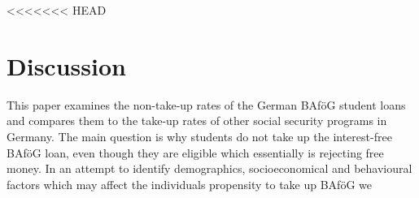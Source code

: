 <<<<<<< HEAD
\section{Discussion}
%
%
This paper examines the non-take-up rates of the German BAföG student loans and compares them to the take-up rates of other social security programs in Germany.
The main question is why students do not take up the interest-free BAföG loan, even though they are eligible which essentially is rejecting free money. 
In an attempt to identify demographics, socioeconomical and behavioural factors which may affect the individuals propensity to take up BAföG we 


%
%

%
%

%
%

%
%

%
%

%
%
